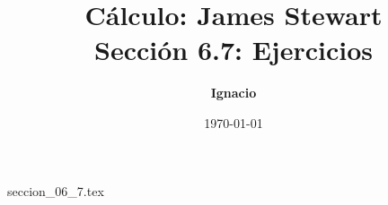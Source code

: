 \documentclass[11pt,spanish,oneside]{report}
\title{\textbf{Cálculo: James Stewart} \\ \Large Sección 6.7: Ejercicios}
\author{\textbf{Ignacio}}
\date{\today}
\begin{document}
\maketitle

{seccion_06_7.tex}
\end{document}
